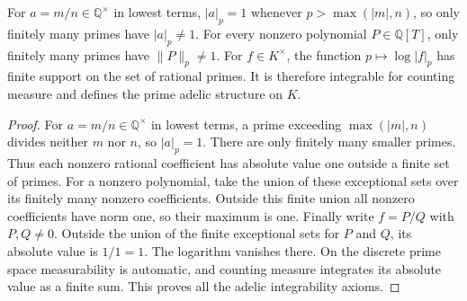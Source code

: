\begin{lemma}
\label{lem:rational-prime-log-integrable}
\leanok
For $a=m/n\in\mathbb Q^\times$ in lowest terms, $|a|_p=1$ whenever
$p>\max(|m|,n)$, so only finitely many primes have $|a|_p\ne1$.
For every nonzero polynomial $P\in\mathbb Q[T]$, only finitely many
primes have $\lVert P\rVert_p\ne1$.
For $f\in K^\times$, the function $p\mapsto\log|f|_p$ has finite
support on the set of rational primes. It is therefore integrable for
counting measure and defines the prime adelic structure on $K$.
\end{lemma}
\begin{proof}
For $a=m/n\in\mathbb Q^\times$ in lowest terms, a prime exceeding
$\max(|m|,n)$ divides neither $m$ nor $n$, so $|a|_p=1$.
There are only finitely many smaller primes. Thus each nonzero rational
coefficient has absolute value one outside a finite set of primes.
For a nonzero polynomial, take the union of these exceptional sets
over its finitely many nonzero coefficients. Outside this finite
union all nonzero coefficients have norm one, so their maximum is one.
Finally write $f=P/Q$ with $P,Q\ne0$. Outside the union of the finite
exceptional sets for $P$ and $Q$, its absolute value is $1/1=1$.
The logarithm vanishes there. On the discrete prime space measurability
is automatic, and counting measure integrates its absolute value as a
finite sum. This proves all the adelic integrability axioms.
\end{proof}

